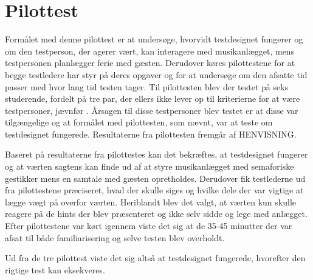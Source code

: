 \section{Pilottest}
\label{PilottestSocialAccept}
%
Formålet med denne pilottest er at undersøge, hvorvidt testdesignet fungerer og om den testperson, der agerer vært, kan interagere med musikanlægget, mens testpersonen planlægger ferie med gæsten. Derudover køres pilottestene for at begge testledere har styr på deres opgaver og for at undersøge om den afsatte tid passer med hvor lang tid testen tager. 
%
Til pilottesten blev der testet på seks studerende, fordelt på tre par, der ellers ikke lever op til kriterierne for at være testpersoner, jævnfør . Årsagen til disse testpersoner blev testet er at disse var tilgængelige og at formålet med pilottesten, som nævnt, var at teste om testdesignet fungerede. Resultaterne fra pilottesten fremgår af HENVISNING. 

Baseret på resultaterne fra pilottestes kan det bekræftes, at testdesignet fungerer og at værten sagtens kan finde ud af at styre musikanlægget med semaforiske gestikker mens en samtale med gæsten opretholdes. Derudover fik testlederne ud fra pilottestene præciseret, hvad der skulle siges og hvilke dele der var vigtige at lægge vægt på overfor værten. Heriblandt blev det valgt, at værten kun skulle reagere på de hints der blev præsenteret og ikke selv sidde og lege med anlægget. Efter pilottestene var kørt igennem viste det sig at de 35-45 minutter der var afsat til både familiarisering og selve testen blev overholdt. 

Ud fra de tre pilottest viste det sig altså at testdesignet fungerede, hvorefter den rigtige test kan eksekveres. 


